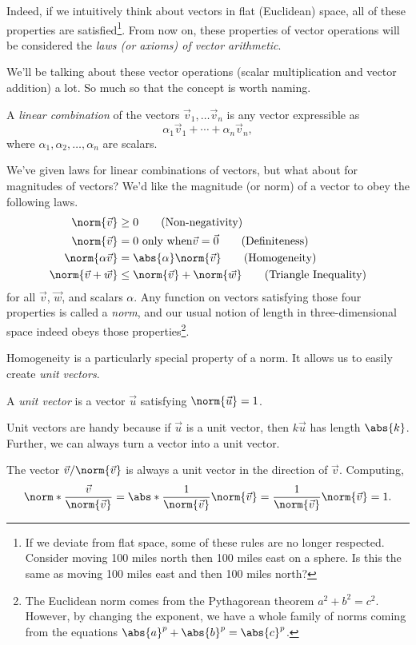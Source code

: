 Indeed, if we intuitively think about vectors in flat (Euclidean) space,
all of these properties are satisfied\footnote{
	If we deviate from flat space, some of these
	rules are no longer respected.  Consider moving 100 miles
	north then 100 miles east on a sphere.  Is this the
	same as moving 100 miles east and then 100 miles north?
}.  From now on, these properties of vector operations will be considered
the 
\emph{laws (or axioms) of vector arithmetic}.

We'll be talking about these vector operations (scalar multiplication and
vector addition) a lot.  So much so that the concept is worth naming.
\begin{definition}
	A \emph{linear combination} of the vectors $\vec v_1,\ldots \vec v_n$
	is any vector expressible as
	\[
		\alpha_1\vec v_1+\cdots +\alpha_n\vec v_n,
	\]
	where $\alpha_1,\alpha_2,\ldots,\alpha_n$ are scalars.
\end{definition}


We've given laws for linear combinations of vectors, but what about
for magnitudes of vectors?  We'd like the magnitude (or norm) of a vector to obey
the following laws.
\begin{align*}
	\norm{\vec v} &\geq 0\tag{Non-negativity}\\
	\norm{\vec v} &= 0\text{ only when}\vec v=\vec 0\tag{Definiteness}\\
	\norm{\alpha\vec v}&=\abs{\alpha}\norm{\vec v}\tag{Homogeneity}\\
	\norm{\vec v+\vec w}&\leq\norm{\vec v}+\norm{\vec w}\tag{Triangle Inequality}
\end{align*}
for all $\vec v$, $\vec w$, and scalars $\alpha$.  Any function on vectors satisfying
those four properties is called a \emph{norm}, and our usual notion
of length in three-dimensional space indeed obeys those properties\footnote{
	The Euclidean norm comes from the Pythagorean theorem $a^2+b^2=c^2$.
	However, by changing the exponent, we have a whole family of norms
	coming from the equations $\abs{a}^p+\abs{b}^p=\abs{c}^p$.
}.

Homogeneity is a particularly special property of a norm.  It allows us
to easily create \emph{unit vectors}.
\begin{definition}
	A \emph{unit vector} is a vector $\vec u$
	satisfying $\norm{\vec u}=1$.
\end{definition}
Unit vectors are handy because if $\vec u$ is a unit vector, then $k\vec u$
has length $\abs{k}$.  Further, we can always turn a vector into a unit vector.
\begin{example}
	The vector $\vec v/\norm{\vec v}$ is always a unit vector in the direction
	of $\vec v$.  Computing,
	\[
		\norm*{\frac{\vec v}{\norm{\vec v}}} = \abs*{\frac{1}{\norm{\vec v}}}\norm{\vec v}=
		\frac{1}{\norm{\vec v}}\norm{\vec v}=1.
	\]
\end{example}


